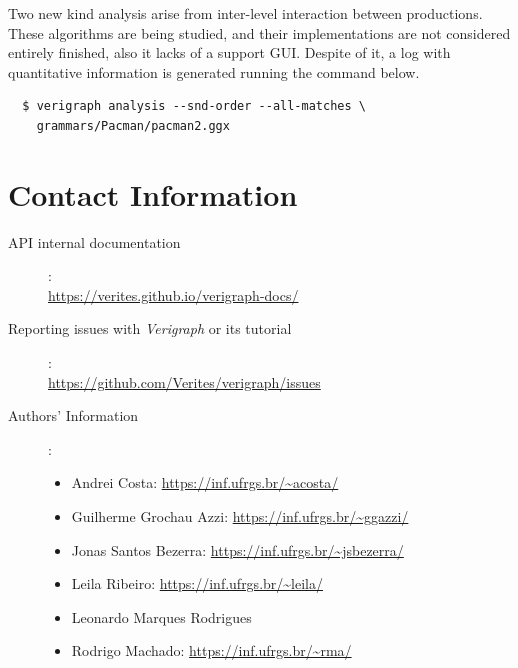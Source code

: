 \documentclass[12pt]{article}
\begin{document}
Two new kind analysis arise from inter-level interaction between productions.
These algorithms are being studied, and their implementations are not considered entirely finished, also it lacks of a support GUI.
Despite of it, a log with quantitative information is generated running the command below.

\begin{verbatim}
  $ verigraph analysis --snd-order --all-matches \
  	grammars/Pacman/pacman2.ggx
\end{verbatim}

\pagebreak

\section{Contact Information}

\begin{description}
\item[API internal documentation]:\\ \url{https://verites.github.io/verigraph-docs/}
\item[Reporting issues with \emph{Verigraph} or its tutorial]:\\ \url{https://github.com/Verites/verigraph/issues}
\item[Authors' Information]:
\begin{itemize}
\item Andrei Costa: \url{https://inf.ufrgs.br/~acosta/}
\item Guilherme Grochau Azzi: \url{https://inf.ufrgs.br/~ggazzi/}
\item Jonas Santos Bezerra: \url{https://inf.ufrgs.br/~jsbezerra/}
\item Leila Ribeiro: \url{https://inf.ufrgs.br/~leila/}
\item Leonardo Marques Rodrigues
\item Rodrigo Machado: \url{https://inf.ufrgs.br/~rma/}
\end{itemize}

\end{description}



\end{document}

